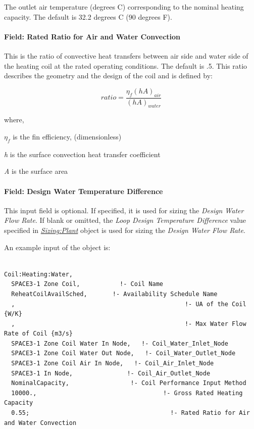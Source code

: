 The outlet air temperature (degrees C) corresponding to the nominal heating capacity. The default is 32.2 degrees C (90 degrees F).

\paragraph{Field: Rated Ratio for Air and Water Convection}\label{field-rated-ratio-for-air-and-water-convection}

This is the ratio of convective heat transfers between air side and water side of the heating coil at the rated operating conditions. The default is .5. This ratio describes the geometry and the design of the coil and is defined by:

\begin{equation}
ratio = \frac{{{\eta_f}{{\left( {hA} \right)}_{air}}}}{{{{\left( {hA} \right)}_{water}}}}
\end{equation}

where,

\({\eta_f}\) is the fin efficiency, (dimensionless)

\emph{h} is the surface convection heat transfer coefficient

\emph{A} is the surface area

\paragraph{Field: Design Water Temperature Difference}

This input field is optional. If specified, it is used for sizing the \textit{Design Water Flow Rate}. If blank or omitted, the \textit{Loop Design Temperature Difference} value specified in \textit{\hyperref[sizingplant]{Sizing:Plant}} object is used for sizing the \textit{Design Water Flow Rate}.

An example input of the object is:

\begin{lstlisting}

Coil:Heating:Water,
  SPACE3-1 Zone Coil,           !- Coil Name
  ReheatCoilAvailSched,       !- Availability Schedule Name
  ,                                               !- UA of the Coil {W/K}
  ,                                               !- Max Water Flow Rate of Coil {m3/s}
  SPACE3-1 Zone Coil Water In Node,   !- Coil_Water_Inlet_Node
  SPACE3-1 Zone Coil Water Out Node,   !- Coil_Water_Outlet_Node
  SPACE3-1 Zone Coil Air In Node,   !- Coil_Air_Inlet_Node
  SPACE3-1 In Node,               !- Coil_Air_Outlet_Node
  NominalCapacity,                 !- Coil Performance Input Method
  10000.,                                   !- Gross Rated Heating Capacity
  0.55;                                       !- Rated Ratio for Air and Water Convection
\end{lstlisting}

